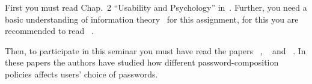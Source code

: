 First you must read Chap.~2 \enquote{Usability and Psychology} in~\cite{Anderson2008sea}.
Further, you need a basic understanding of information 
theory~\cite{Shannon1948amt} for this assignment, for this you are recommended 
to read ~\cite{Ueltschi2013se}.

Then, to participate in this seminar you must have read the papers 
~\cite{Komanduri2011opa},
~\cite{kelley2012guess} and
~\cite{Komanduri2014can}.
In these papers the authors have studied how different password-composition 
policies affects users' choice of passwords.

